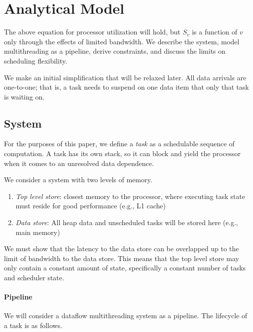 \section{Analytical Model}

The above equation for processor utilization will hold, but $S_v$ is a
function of $v$ only through the effects of limited bandwidth. We
describe the system, model multithreading as a pipeline, derive
constraints, and discuss the limits on scheduling flexibility.

We make an initial simplification that will be relaxed later. All data
arrivals are one-to-one; that is, a task needs to suspend on one data
item that only that task is waiting on. 

\subsection{System}

For the purposes of this paper, we define a \emph{task} as a
schedulable sequence of computation. A task has its own stack, so it
can block and yield the processor when it comes to an unresolved data
dependence.

We consider a system with two levels of memory.
\begin{enumerate}
    \item \emph{Top level store}: closest memory to the processor, where
        executing task state must reside for good performance (e.g., L1 cache)
    \item \emph{Data store}: All heap data and unscheduled tasks will be
        stored here (e.g., main memory)
\end{enumerate}

We must show that the latency to the data store can be overlapped up
to the limit of bandwidth to the data store. This means that the top
level store may only contain a constant amount of state, specifically
a constant number of tasks and scheduler state.

\paragraph{Pipeline}

We will consider a dataflow multithreading system as a pipeline. The
lifecycle of a task is as follows.

